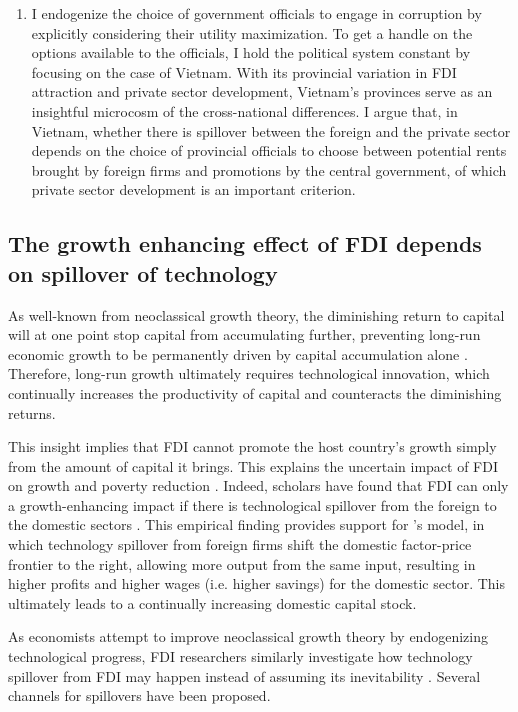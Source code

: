 \begin{enumerate}
\item I endogenize the choice of government officials to engage in corruption by explicitly considering their utility maximization. To get a handle on the options available to the officials, I hold the political system constant by focusing on the case of Vietnam. With its provincial variation in FDI attraction and private sector development, Vietnam's provinces serve as an insightful microcosm of the cross-national differences. I argue that, in Vietnam, whether there is spillover between the foreign and the private sector depends on the choice of provincial officials to choose between potential rents brought by foreign firms and promotions by the central government, of which private sector development is an important criterion.
\end{enumerate}

\subsection{The growth enhancing effect of FDI depends on spillover of technology}

As well-known from neoclassical growth theory, the diminishing return to capital will at one point stop capital from accumulating further, preventing long-run economic growth to be permanently driven by capital accumulation alone \citep{Solow1956}. Therefore, long-run growth ultimately requires technological innovation, which continually increases the productivity of capital and counteracts the diminishing returns.

This insight implies that FDI cannot promote the host country's growth simply from the amount of capital it brings. This explains the uncertain impact of FDI on growth and poverty reduction \citep{Nair-Reichert2001, Carkovic2002, Guerra2009}. Indeed, scholars have found that FDI can only a growth-enhancing impact if there is technological spillover from the foreign to the domestic sectors \citep{Nunnenkamp2004}. This empirical finding provides support for \citet{Findlay1978}'s model, in which technology spillover from foreign firms shift the domestic factor-price frontier to the right, allowing more output from the same input, resulting in higher profits and higher wages (i.e. higher savings) for the domestic sector. This ultimately leads to a continually increasing domestic capital stock.

As economists attempt to improve neoclassical growth theory by endogenizing technological progress, FDI researchers similarly investigate how technology spillover from FDI may happen instead of assuming its inevitability \citep{Romer1994}. Several channels for spillovers have been proposed.

